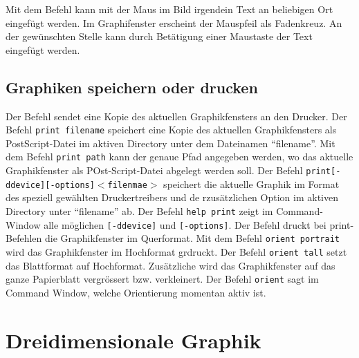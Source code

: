 \newline\newline
Mit dem Befehl  kann mit der Maus im Bild irgendein Text an beliebigen Ort eingefügt werden. Im Graphifenster erscheint der Mauspfeil als Fadenkreuz. An der gewünschten Stelle kann durch Betätigung einer Maustaste der Text eingefügt werden.
\subsection{Graphiken speichern oder drucken}
Der Befehl  sendet eine Kopie des aktuellen Graphikfensters an den Drucker. Der Befehl {\color{red}\texttt{print filename}} speichert eine Kopie des aktuellen Graphikfensters als PostScript-Datei im aktiven Directory unter dem Dateinamen ``filename''. Mit dem Befehl {\color{red}\texttt{print path}} kann der genaue Pfad angegeben werden, wo das aktuelle Graphikfenster als POst-Script-Datei abgelegt werden soll. Der Befehl {\color{red}\texttt{print[-ddevice][-options]$<$filenmae$>$}} speichert die aktuelle Graphik im Format des speziell gewählten Druckertreibers und de rzusätzlichen Option im aktiven Directory unter ``filename'' ab. Der Befehl {\color{red}\texttt{help print}} zeigt im Command-Window alle möglichen \texttt{[-ddevice]} und \texttt{[-options]}.
\newline\newline
Der Befehl  druckt bei print-Befehlen die Graphikfenster im Querformat. Mit dem Befehl {\color{red}\texttt{orient portrait}} wird das Graphikfenster im Hochformat grdruckt. Der Befehl {\color{red}\texttt{orient tall}} setzt das Blattformat auf Hochformat. Zusätzliche wird das Graphikfenster auf das ganze Papierblatt vergrössert bzw. verkleinert. Der Befehl {\color{red}\texttt{orient}} sagt im Command Window, welche Orientierung momentan aktiv ist.
\section{Dreidimensionale Graphik}
